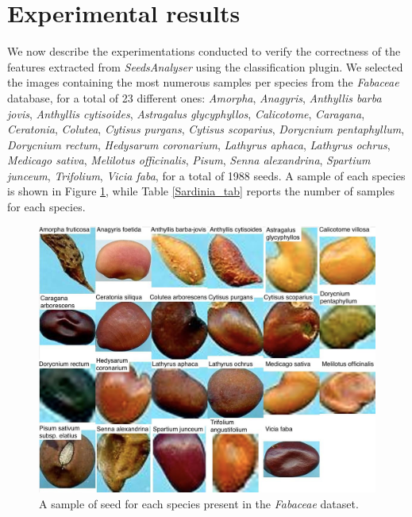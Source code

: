 \documentclass[a4paper,12pt]{article}
\begin{document}
\section{Experimental results} 
We now describe the experimentations conducted to verify the correctness of the features extracted from \emph{SeedsAnalyser} using the classification plugin.
We selected the images containing the most numerous samples per species from the \emph{Fabaceae} database, for a total of 23 different ones: 
\emph{Amorpha}, \emph{Anagyris}, \emph{Anthyllis barba jovis}, \emph{Anthyllis cytisoides}, \emph{Astragalus glycyphyllos}, \emph{Calicotome}, \emph{Caragana}, \emph{Ceratonia}, \emph{Colutea}, \emph{Cytisus purgans}, \emph{Cytisus scoparius}, \emph{Dorycnium pentaphyllum}, \emph{Dorycnium rectum}, \emph{Hedysarum coronarium}, \emph{Lathyrus aphaca}, \emph{Lathyrus ochrus}, \emph{Medicago sativa}, \emph{Melilotus officinalis}, \emph{Pisum}, \emph{Senna alexandrina}, \emph{Spartium junceum}, \emph{Trifolium}, \emph{Vicia faba}, for a total of 1988 seeds.
A sample of each species is shown in Figure \ref{Sardinia_samples}, while Table \ref{Sardinia_tab} reports the number of samples for each species.

\begin{figure}[htbp]
	\centering
	\includegraphics[scale=0.65]{Img/Sardinia_samples.jpg}
	\caption{A sample of seed for each species present in the \emph{Fabaceae} dataset.}
	\label{Sardinia_samples}
\end{figure}
\end{document}

